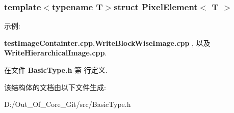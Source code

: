 \subsubsection*{template$<$typename T$>$struct Pixel\-Element$<$ T $>$}

\begin{Desc}
\item[示例\-: ]\par
{\bf test\-Image\-Containter.\-cpp},{\bf Write\-Block\-Wise\-Image.\-cpp} , 以及 {\bf Write\-Hierarchical\-Image.\-cpp}.\end{Desc}


在文件 {\bf Basic\-Type.\-h} 第  行定义.



该结构体的文档由以下文件生成\-:\begin{DoxyCompactItemize}
\item 
D\-:/\-Out\-\_\-\-Of\-\_\-\-Core\-\_\-\-Git/src/Basic\-Type.\-h\end{DoxyCompactItemize}
